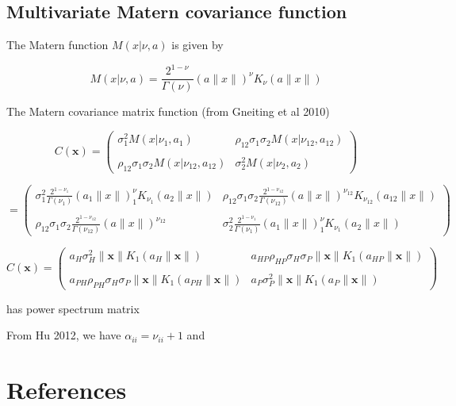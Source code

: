 \documentclass{article}
\begin{document}
\hypertarget{multivariate-matern-covariance-function}{%
\subsection{Multivariate Matern covariance
function}\label{multivariate-matern-covariance-function}}

The Matern function \(M(x|\nu,a)\) is given by

\[M(x|\nu,a)=\frac{2^{1-\nu}}{\Gamma(\nu)}(a\|x\|)^\nu K_\nu(a\|x\|)\]

The Matern covariance matrix function (from Gneiting et al 2010)

\[C(\pmb x)=\left(\begin{matrix}
  \sigma_1^2M(x|\nu_1,a_1) & \rho_{12}\sigma_1\sigma_2M(x|\nu_{12},a_{12}) \\ & \\
  \rho_{12}\sigma_1\sigma_2M(x|\nu_{12},a_{12}) & \sigma_2^2M(x|\nu_2,a_2)
\end{matrix}\right)\]

\[=\left(\begin{matrix}
  \sigma_1^2\frac{2^{1-\nu_1}}{\Gamma(\nu_1)}(a_1\|x\|)^\nu_1 K_{\nu_1}(a_2\|x\|) & \rho_{12}\sigma_1\sigma_2\frac{2^{1-\nu_{12}}}{\Gamma(\nu_{12})}(a\|x\|)^{\nu_{12}} K_{\nu_{12}}(a_{12}\|x\|) \\ & \\
  \rho_{12}\sigma_1\sigma_2\frac{2^{1-\nu_{12}}}{\Gamma(\nu_{12})}(a\|x\|)^{\nu_{12}} & \sigma_2^2\frac{2^{1-\nu_1}}{\Gamma(\nu_1)}(a_1\|x\|)^\nu_1 K_{\nu_1}(a_2\|x\|)
\end{matrix}\right)\]

\[C(\pmb x)=\left(\begin{matrix}
  a_H\sigma_H^2\|\pmb x\|K_1(a_H\|\pmb x\|) & a_{HP}\rho_{HP}\sigma_H\sigma_P\|\pmb x\|K_1(a_{HP}\|\pmb x\|) \\ & \\
  a_{PH}\rho_{PH}\sigma_H\sigma_P\|\pmb x\|K_1(a_{PH}\|\pmb x\|) & a_P\sigma_P^2\|\pmb x\|K_1(a_P\|\pmb x\|)
\end{matrix}\right)\]

has power spectrum matrix

From Hu 2012, we have \(\alpha_{ii}=\nu_{ii}+1\) and

\newpage

\hypertarget{references}{%
\section*{References}\label{references}}
\end{document}

